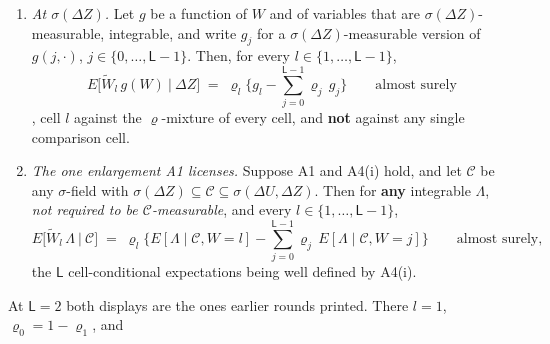\begin{lemma}\label{lem:pbinary}
\begin{enumerate}
\item[\textup{(P4b)}] \emph{At $\sigma(\Delta Z)$.} Let $g$ be a function of $W$ and of variables that are
$\sigma(\Delta Z)$-measurable, integrable, and write $g_j$ for a $\sigma(\Delta Z)$-measurable version of
$g(j,\cdot)$, $j\in\{0,\dots,\mathsf L-1\}$. Then, for every $l\in\{1,\dots,\mathsf L-1\}$,
\[
E\big[\widetilde W_l\,g(W)\ \big|\ \Delta Z\big]
\;=\;\varrho_l\Big\{g_l-\sum_{j=0}^{\mathsf L-1}\varrho_j\,g_j\Big\}
\qquad\text{almost surely}
\]
, cell $l$ against the $\varrho$-mixture of every cell, and \textbf{not} against any single comparison
cell.
\item[\textup{(P4c)}] \emph{The one enlargement A1 licenses.} Suppose A1 and A4(i) hold, and let
$\mathcal C$ be any $\sigma$-field with
$\sigma(\Delta Z)\subseteq\mathcal C\subseteq\sigma(\Delta U,\Delta Z)$. Then for \textbf{any} integrable
$\Lambda$, \emph{not required to be $\mathcal C$-measurable}, and every
$l\in\{1,\dots,\mathsf L-1\}$,
\[
E\big[\widetilde W_l\,\Lambda\ \big|\ \mathcal C\big]
\;=\;\varrho_l\Big\{E[\Lambda\mid\mathcal C,W=l]-\sum_{j=0}^{\mathsf L-1}\varrho_j\,E[\Lambda\mid\mathcal C,W=j]\Big\}
\qquad\text{almost surely,}
\]
the $\mathsf L$ cell-conditional expectations being well defined by A4(i).
\end{enumerate}
At $\mathsf L=2$ both displays are the ones earlier rounds printed. There $l=1$,
$\varrho_0=1-\varrho_1$, and

\end{lemma}
